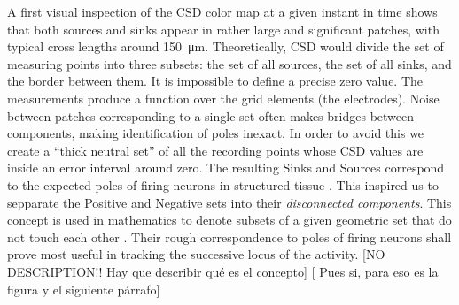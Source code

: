 \documentclass[letterpaper,12pts]{article}
\newcommand{\mum}[1]{\SI{#1}{\micro\metre}}
\newcommand{\komment}[1]{{\color{red} [#1]}}
\newcommand{\romment}[1]{{\color{blue} [#1]}}
\begin{document}
A first visual inspection of the CSD color map at a given instant in time shows that both sources and sinks appear in rather large and significant patches, with typical
cross lengths around \mum{150}.
Theoretically, CSD would divide the set of measuring points into three subsets: the set of all sources, the set of all sinks, and the border between them.
It is impossible to define a precise zero value.
The measurements produce a function over the grid elements (the electrodes).
Noise between patches corresponding to a single set often makes bridges
between components, making identification of poles inexact.
In order to avoid this we create a ``thick neutral set'' of all the recording
points whose CSD values are inside an error interval around zero.
The resulting Sinks and Sources  correspond to the expected poles of firing neurons in structured tissue \cite{Buzsaki2012}. This inspired us to  sepparate the Positive and Negative sets into their \emph{disconnected components}. This concept is used in mathematics to denote subsets of a given geometric set that do not touch each other  \cite{Halmos}. Their rough correspondence to poles of firing neurons shall prove  most useful in tracking the successive locus of the activity. 
\romment{NO DESCRIPTION!! Hay que describir qué es el concepto}
\komment{ Pues si, para eso es la figura y el siguiente párrafo}
\end{document}
